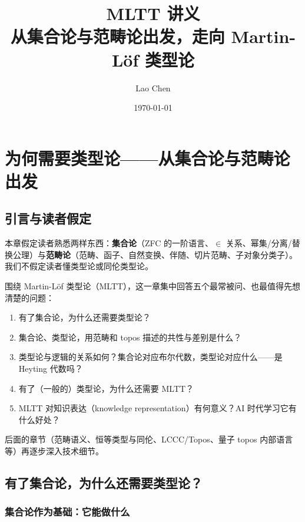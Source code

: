 \documentclass[10pt, openany]{book}
\begin{document}
\frontmatter
\title{\textbf{MLTT 讲义}\\ \large 从集合论与范畴论出发，走向 Martin-L\"of 类型论}
\author{Lao Chen}
\date{\today}
\maketitle
\tableofcontents

\mainmatter

\chapter{为何需要类型论——从集合论与范畴论出发}

\section{引言与读者假定}

本章假定读者熟悉两样东西：\textbf{集合论}（ZFC 的一阶语言、$\in$ 关系、幂集/分离/替换公理）与\textbf{范畴论}（范畴、函子、自然变换、伴随、切片范畴、子对象分类子）。我们不假定读者懂类型论或同伦类型论。

围绕 Martin-L\"of 类型论（MLTT），这一章集中回答五个最常被问、也最值得先想清楚的问题：
\begin{enumerate}
  \item 有了集合论，为什么还需要类型论？
  \item 集合论、类型论，用范畴和 topos 描述的共性与差别是什么？
  \item 类型论与逻辑的关系如何？集合论对应布尔代数，类型论对应什么——是 Heyting 代数吗？
  \item 有了（一般的）类型论，为什么还需要 MLTT？
  \item MLTT 对知识表达（knowledge representation）有何意义？AI 时代学习它有什么好处？
\end{enumerate}
后面的章节（范畴语义、恒等类型与同伦、LCCC/Topos、量子 topos 内部语言等）再逐步深入技术细节。

\section{有了集合论，为什么还需要类型论？}

\subsection{集合论作为基础：它能做什么}
\end{document}
